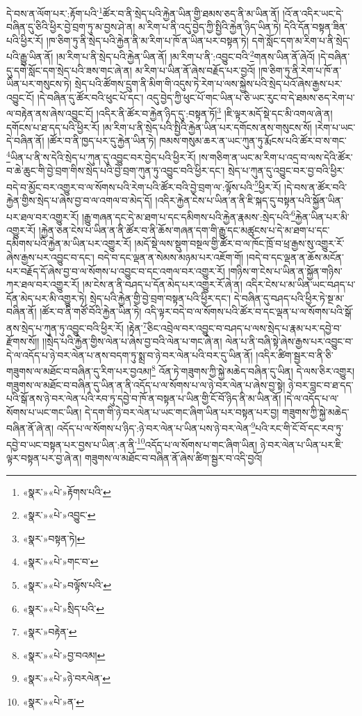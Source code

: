 དེ་བས་ན་ལོག་པར་:རྟོག་པའི་\footnote{«སྣར་»«པེ་»རྟོགས་པའི་}ཚོར་བ་ནི་སྲེད་པའི་རྐྱེན་ཡིན་གྱི་ཐམས་ཅད་ནི་མ་ཡིན་ནོ། །འོ་ན་འདིར་ཡང་དེ་བཞིན་དུ་ཅིའི་ཕྱིར་བྱེ་བྲག་ཏུ་མ་བྱས་ཤེ་ན། མ་རིག་པ་ནི་འདུ་བྱེད་ཀྱི་སྤྱིའི་རྐྱེན་ཉིད་ཡིན་ཏེ། དེའི་དོན་བསྟན་ཟིན་པའི་ཕྱིར་རོ། །ཁ་ཅིག་ཏུ་ནི་སྲེད་པའི་རྐྱེན་ནི་མ་རིག་པ་ཁོ་ན་ཡིན་པར་བསྟན་ཏེ། དགེ་སློང་དག་མ་རིག་པ་ནི་སྲེད་པའི་རྒྱུ་ཡིན་ནོ། །མ་རིག་པ་ནི་སྲེད་པའི་རྐྱེན་ཡིན་ནོ། །མ་རིག་པ་ནི་:འབྱུང་བའི་\footnote{«སྣར་»«པེ་»འབྱུང་}གནས་ཡིན་ནོ་ཞེའོ། །དེ་བཞིན་དུ་དགེ་སློང་དག་སྲེད་པའི་ཟས་གང་ཞེ་ན། མ་རིག་པ་ཡིན་ནོ་ཞེས་བརྗོད་པར་བྱའོ། །ཁ་ཅིག་ཏུ་ནི་རེག་པ་ཁོ་ན་ཡིན་པར་གསུངས་ཏེ། སྲེད་པའི་ཚོགས་དྲུག་ནི་མིག་གི་འདུས་ཏེ་རེག་པ་ལས་སྐྱེས་པའི་སྲེད་པའོ་ཞེས་རྒྱས་པར་འབྱུང་ངོ། །དེ་བཞིན་དུ་ཚོར་བའི་ཕུང་པོ་དང་། འདུ་བྱེད་ཀྱི་ཕུང་པོ་གང་ཡིན་པ་ཅི་ཡང་རུང་བ་དེ་ཐམས་ཅད་རེག་པ་ལ་བརྟེན་ནས་ཞེས་འབྱུང་ངོ། །འདིར་ནི་ཚོར་བ་རྐྱེན་ཉིད་དུ་:བསྟན་ཏོ།\footnote{«སྣར་»བསྟན་ཏེ།} །ཇི་ལྟར་མདོ་སྡེ་དང་མི་འགལ་ཞེ་ན། དགོངས་པ་ཐ་དད་པའི་ཕྱིར་རོ། །མ་རིག་པ་ནི་སྲེད་པའི་སྤྱིའི་རྐྱེན་ཡིན་པར་དགོངས་ནས་གསུངས་སོ། །རེག་པ་ཡང་དེ་བཞིན་ནོ། །ཚོར་བ་ནི་ཁྱད་པར་དུ་རྐྱེན་ཡིན་ཏེ། ཁམས་གསུམ་ཆར་ན་ཡང་ཀུན་ཏུ་རྨོངས་པའི་ཚོར་བ་ས་གང་\footnote{«སྣར་»«པེ་»གང་བ་}ཡིན་པ་ནི་ས་དེའི་སྲེད་པ་ཀུན་དུ་འབྱུང་བར་བྱེད་པའི་ཕྱིར་རོ། །ས་གཅིག་ན་ཡང་མ་རིག་པ་འདྲ་བ་ལས་དེའི་ཚོར་བ་ཆེ་ཆུང་གི་བྱེ་བྲག་གིས་སྲེད་པའི་བྱེ་བྲག་ཀུན་ཏུ་འབྱུང་བའི་ཕྱིར་དང་། སྲེད་པ་ཀུན་དུ་འབྱུང་བར་བྱ་བའི་ཕྱིར་བདེ་བ་མྱོང་བར་འགྱུར་བ་ལ་སོགས་པའི་རེག་པའི་ཚོར་བའི་བྱེ་བྲག་ལ་:ལྟོས་པའི་\footnote{«སྣར་»«པེ་»བལྟོས་པའི་}ཕྱིར་རོ། །དེ་བས་ན་ཚོར་བའི་རྐྱེན་གྱིས་སྲེད་པ་ཞེས་བྱ་བ་ལ་འགལ་བ་མེད་དོ། །འདིར་རྐྱེན་ངེས་པ་ཡིན་ན་ནི་ཇི་སྐད་དུ་བསྟན་པའི་སྐྱོན་ཡིན་པར་ཐལ་བར་འགྱུར་རོ། །རྒྱུ་གཞན་དང་དེ་མ་ཐག་པ་དང་དམིགས་པའི་རྐྱེན་རྣམས་:སྲེད་པའི་\footnote{«སྣར་»«པེ་»སྲིད་པའི་}རྐྱེན་ཡིན་པར་མི་འགྱུར་རོ། །རྐྱེན་ཅན་ངེས་པ་ཡིན་ན་ནི་ཚོར་བ་ནི་ཆོས་གཞན་དག་གི་རྒྱུ་དང་མཚུངས་པ་དེ་མ་ཐག་པ་དང་དམིགས་པའི་རྐྱེན་མ་ཡིན་པར་འགྱུར་རོ། །མདོ་སྡེ་ལས་སྡུག་བསྔལ་གྱི་ཚོར་བ་ལ་ཁོང་ཁྲོ་བ་ཕྲ་རྒྱས་སུ་འགྱུར་རོ་ཞེས་རྒྱས་པར་འབྱུང་བ་དང་། བདེ་བ་དང་ལྡན་ན་སེམས་མཉམ་པར་འཇོག་གོ། །བདེ་བ་དང་ལྡན་ན་ཆོས་མངོན་པར་བརྗོད་དོ་ཞེས་བྱ་བ་ལ་སོགས་པ་འབྱུང་བ་དང་འགལ་བར་འགྱུར་རོ། །གཉིས་ག་ངེས་པ་ཡིན་ན་སྐྱོན་གཉིས་ཀར་ཐལ་བར་འགྱུར་རོ། །མ་ངེས་ན་ནི་བཤད་པ་དོན་མེད་པར་འགྱུར་རོ་ཞེ་ན། འདིར་ངེས་པ་མ་ཡིན་ཡང་བཤད་པ་དོན་མེད་པར་མི་འགྱུར་ཏེ། སྲེད་པའི་རྐྱེན་གྱི་བྱེ་བྲག་བསྟན་པའི་ཕྱིར་དང་། དེ་བཞིན་དུ་བཤད་པའི་ཕྱིར་ཏེ་སྔ་མ་བཞིན་ནོ། །ཚོར་བ་ནི་གཙོ་བོའི་རྐྱེན་ཡིན་ཏེ། འདི་ལྟར་བདེ་བ་ལ་སོགས་པའི་ཚོར་བ་དང་ལྡན་པ་ལ་སོགས་པའི་སྒོ་ནས་སྲེད་པ་ཀུན་ཏུ་འབྱུང་བའི་ཕྱིར་རོ། །རྟེན་\footnote{«སྣར་»བརྟེན་}ཅིང་འབྲེལ་བར་འབྱུང་བ་བཤད་པ་ལས་སྲེད་པ་རྣམ་པར་དབྱེ་བ་རྫོགས་སོ།། །།སྲེད་པའི་རྐྱེན་གྱིས་ལེན་པ་ཞེས་བྱ་བའི་ལེན་པ་གང་ཞེ་ན། ལེན་པ་ནི་བཞི་སྟེ་ཞེས་རྒྱས་པར་འབྱུང་བ་དེ་ལ་འདོད་པ་ཉེ་བར་ལེན་པ་ནས་བདག་ཏུ་སྨྲ་བ་ཉེ་བར་ལེན་པའི་བར་དུ་ཡིན་ནོ། །འདིར་ཚིག་སྦྱར་བ་ནི་ཅི་གཟུགས་ལ་མཐོང་བ་བཞིན་དུ་རིག་པར་བྱའམ།\footnote{«སྣར་»«པེ་»བྱ་བའམ།} འོན་ཏེ་གཟུགས་ཀྱི་སྐྱེ་མཆེད་བཞིན་དུ་ཡིན། དེ་ལས་ཅིར་འགྱུར། གཟུགས་ལ་མཐོང་བ་བཞིན་དུ་ཡིན་ན་ནི་འདོད་པ་ལ་སོགས་པ་ལ་ཉེ་བར་ལེན་པ་ཞེས་བྱ་སྟེ། ཉེ་བར་བླང་བ་ཐ་དད་པའི་སྒོ་ནས་ཉེ་བར་ལེན་པའི་རབ་ཏུ་དབྱེ་བ་ཁོ་ན་བསྟན་པ་ཡིན་གྱི་ངོ་བོ་ཉིད་ནི་མ་ཡིན་ནོ། །དེ་ལ་འདོད་པ་ལ་སོགས་པ་ཡང་གང་ཡིན། དེ་དག་གི་ཉེ་བར་ལེན་པ་ཡང་གང་ཞིག་ཡིན་པར་བསྟན་པར་བྱ། གཟུགས་ཀྱི་སྐྱེ་མཆེད་བཞིན་ནོ་ཞེ་ན། འདོད་པ་ལ་སོགས་པ་ཉིད་:ཉེ་བར་ལེན་པ་ཡིན་པས་ཉེ་བར་ལེན་\footnote{«སྣར་»«པེ་»ཉེ་བརལེན་}པའི་རང་གི་ངོ་བོ་དང་རབ་ཏུ་དབྱེ་བ་ཡང་བསྟན་པར་བྱས་པ་ཡིན་:ན་ནི་\footnote{«སྣར་»«པེ་»ན་}འདོད་པ་ལ་སོགས་པ་གང་ཞིག་ཡིན། ཉེ་བར་ལེན་པ་ཡིན་པར་ཇི་ལྟར་བསྟན་པར་བྱ་ཞེ་ན། གཟུགས་ལ་མཐོང་བ་བཞིན་ནོ་ཞེས་ཚིག་སྦྱར་བ་འདི་བྱའོ། 